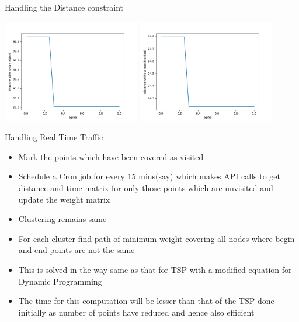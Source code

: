 \documentclass{beamer}
\begin{document}
\begin{frame}{Handling the Distance constraint}
\begin{center}
\includegraphics[width=0.45\textwidth]{dist_w_bid.png}
\includegraphics[width=0.45\textwidth]{dist_wo_bid.png}
\end{center}
\end{frame}


\begin{frame}{Handling Real Time Traffic}
\begin{itemize}[<+- | alert@+>]
\item Mark the points which have been covered as visited
\item Schedule a Cron job for every 15 mins(say) which makes API calls to get distance and time matrix for only those points which are unvisited and update the weight matrix
\item Clustering remains same
\item For each cluster find path of minimum weight covering all nodes where begin and end points are not the same
\item This is solved in the way same as that for TSP with a modified equation for Dynamic Programming
\item The time for this computation will be lesser than that of the TSP done initially as number of points have reduced and hence also efficient
\end{itemize}
\end{frame}
\end{document}
